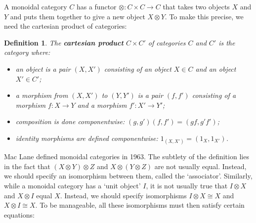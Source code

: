 \documentclass[12pt,twoside,openright]{report}
\newtheorem{definition}[thm]{Definition}
\newcommand{\maps}{\colon}
\newcommand{\tensor}{\otimes}
\begin{document}
A monoidal category $C$ has a functor $\tensor \maps C \times C \to C$
that takes two objects $X$ and $Y$ and puts them together to give a new object $X \tensor Y$.  To make this precise, we need the cartesian product of categories:

\begin{definition} The {\bf cartesian product} $C \times C'$ of categories $C$ and $C'$ is the category where:
\begin{itemize}
\item an object is a pair $(X,X')$ consisting of an object $X \in C$ and an object 
$X' \in C'$;
\item a morphism from $(X,X')$ to $(Y,Y')$ is a pair $(f,f')$ consisting of a morphism $f \maps X \to Y$ and a morphism $f' \maps X' \to Y'$;
\item composition is done componentwise: $(g,g')(f,f') = (gf,g'f')$;
\item identity morphisms are defined componentwise:
$1_{(X,X')} = (1_X, 1_{X'})$.
\end{itemize}
\end{definition}

Mac Lane \cite{MacLane} defined monoidal categories in 1963.  The subtlety of the definition lies in the fact that $(X \tensor Y)
\tensor Z$ and $X \tensor (Y \tensor Z)$ are not usually equal. Instead, we should specify an isomorphism between them, called the
`associator'.  Similarly, while a monoidal category has a `unit object' $I$, it is not usually true that $I \tensor X$ and $X \tensor I$ 
equal $X$.  Instead, we should specify isomorphisms $I \tensor X \cong X$
and $X \tensor I \cong X$.  To be manageable, all these isomorphisms must then satisfy certain equations:
\end{document}
